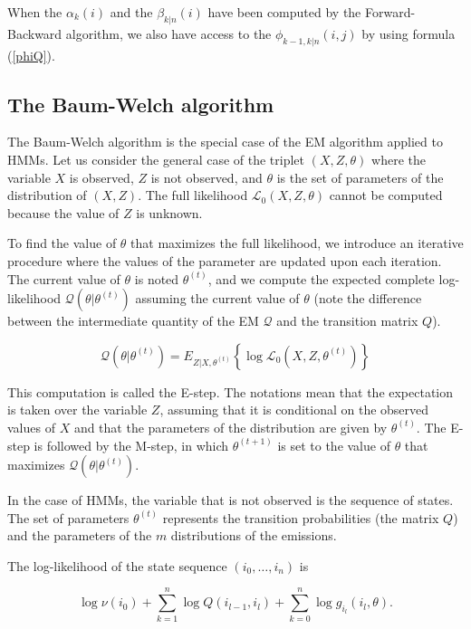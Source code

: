 \documentclass[12pt]{article}
\begin{document}
\begin{appendices}
    When the $\alpha_k(i)$ and the $\beta_{k|n}(i)$ have been
    computed by the Forward-Backward algorithm, we also have access
    to the $\phi_{k-1,k|n}(i,j)$ by using formula (\ref{phiQ}).
    

\subsection{The Baum-Welch algorithm}

    The Baum-Welch algorithm is the special case of the EM algorithm
    applied to HMMs. Let us consider the general case of the triplet
    $(X, Z, \theta)$ where the variable $X$ is observed, $Z$ is not
    observed, and $\theta$ is the set of parameters of the distribution
    of $(X,Z)$. The full likelihood $\mathcal{L}_0(X, Z, \theta)$
    cannot be computed because the value of $Z$ is unknown.

    To find the value of $\theta$ that maximizes the full likelihood,
    we introduce an iterative procedure where the values of the
    parameter are updated upon each iteration. The current value of
    $\theta$ is noted $\theta^{(t)}$, and we compute the expected
    complete log-likelihood $\mathcal{Q}(\theta|\theta^{(t)})$
    assuming the current value of $\theta$ (note the difference
    between the intermediate quantity of the EM $\mathcal{Q}$ and
    the transition matrix $Q$).

    $$ \mathcal{Q}(\theta|\theta^{(t)}) =
      E_{Z|X, \theta^{(t)}} \left\{
      \log \mathcal{L}_0(X, Z, \theta^{(t)}) \right\}$$

    This computation is called the E-step. The notations mean that
    the expectation is taken over the variable $Z$, assuming that
    it is conditional on the observed values of $X$ and that the
    parameters of the distribution are given by $\theta^{(t)}$.
    The E-step is followed by the
    M-step, in which $\theta^{(t+1)}$ is set to the value of
    $\theta$ that maximizes $\mathcal{Q}(\theta|\theta^{(t)})$.

    In the case of HMMs, the variable that is not observed is the
    sequence of states. The set of parameters $\theta^{(t)}$
    represents the transition probabilities (the matrix $Q$)
    and the parameters of the $m$ distributions of the emissions.

    The log-likelihood of the state sequence $(i_0, \ldots, i_n)$
    is

    $$ \log \nu(i_0) + \sum_{k=1}^n \log Q(i_{l-1}, i_l)
      + \sum_{k=0}^n \log g_{i_l}(i_l, \theta). $$


\end{appendices}
\end{document}
